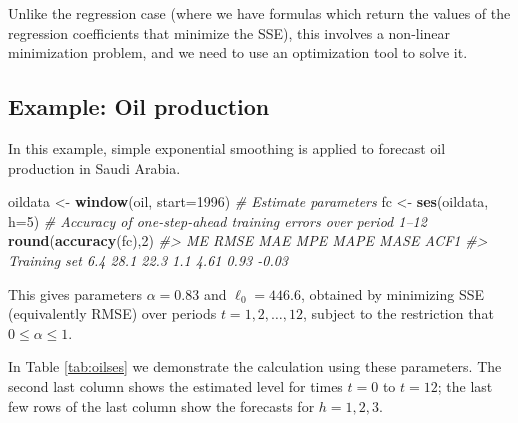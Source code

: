 \documentclass[]{book}
\newenvironment{Shaded}{\begin{snugshade}}{\end{snugshade}}
\newcommand{\CommentTok}[1]{\textcolor[rgb]{0.56,0.35,0.01}{\textit{#1}}}
\newcommand{\DataTypeTok}[1]{\textcolor[rgb]{0.13,0.29,0.53}{#1}}
\newcommand{\DecValTok}[1]{\textcolor[rgb]{0.00,0.00,0.81}{#1}}
\newcommand{\KeywordTok}[1]{\textcolor[rgb]{0.13,0.29,0.53}{\textbf{#1}}}
\newcommand{\NormalTok}[1]{#1}
\newcommand{\StringTok}[1]{\textcolor[rgb]{0.31,0.60,0.02}{#1}}
\begin{document}
Unlike the regression case (where we have formulas which return the values of the regression coefficients that minimize the SSE), this involves a non-linear minimization problem, and we need to use an optimization tool to solve it.

\hypertarget{example-oil-production}{%
\subsection*{Example: Oil production}\label{example-oil-production}}

In this example, simple exponential smoothing is applied to forecast oil production in Saudi Arabia.

\begin{Shaded}
\begin{Highlighting}[]
\NormalTok{oildata <-}\StringTok{ }\KeywordTok{window}\NormalTok{(oil, }\DataTypeTok{start=}\DecValTok{1996}\NormalTok{)}
\CommentTok{# Estimate parameters}
\NormalTok{fc <-}\StringTok{ }\KeywordTok{ses}\NormalTok{(oildata, }\DataTypeTok{h=}\DecValTok{5}\NormalTok{)}
\CommentTok{# Accuracy of one-step-ahead training errors over period 1--12}
\KeywordTok{round}\NormalTok{(}\KeywordTok{accuracy}\NormalTok{(fc),}\DecValTok{2}\NormalTok{)}
\CommentTok{#>               ME RMSE  MAE MPE MAPE MASE  ACF1}
\CommentTok{#> Training set 6.4 28.1 22.3 1.1 4.61 0.93 -0.03}
\end{Highlighting}
\end{Shaded}

This gives parameters \(\alpha=0.83\) and
\(\ell_0=446.6\), obtained by minimizing SSE (equivalently RMSE) over periods \(t=1,2,\dots,12\), subject to the restriction that \(0\le\alpha\le1\).

In Table \ref{tab:oilses} we demonstrate the calculation using these parameters. The second last column shows the estimated level for times \(t=0\) to \(t=12\); the last few rows of the last column show the forecasts for \(h=1,2,3\).
\end{document}
